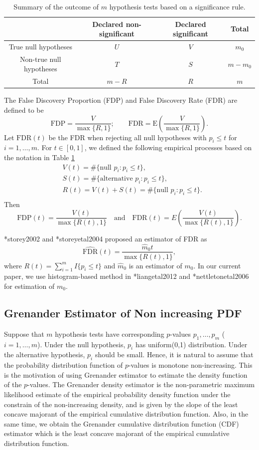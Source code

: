 \documentclass[12pt, letter]{article}\usepackage[]{graphicx}\usepackage[]{color}
\begin{document}
\begin{table}
\centering
\begin{tabular}{|c|cc|c|}
\hline
& Declared non-significant   & Declared significant & Total \\
\hline
True null hypotheses & $U$ & $V$ & $m_0$\\
Non-true null hypotheses & $T$ & $S$ & $m - m_0$\\
\hline
Total & $m-R$ & $R$ & $m$\\
\hline
\end{tabular}
\caption{Summary of the outcome of $m$ hypothesis tests based on a significance rule.}
\label{tab:t1}
\end{table}
The False Discovery Proportion (FDP) and False Discovery Rate (FDR) are defined to be
\[
\mbox{FDP} =\frac{V}{\max\{R,1\}};\qquad   \mbox{FDR} =\mbox{E}\left(\frac{V}{\max\{R,1\}} \right).
\]
Let $\mbox{FDR}(t)$ be the FDR when rejecting all null hypotheses with $p_i \leq t$ for $i = 1, \dots, m$. For $t\in [0,1]$, we  defined the following empirical processes based on the notation in Table \ref{tab:t1}
\begin{align*}
& V(t) = \#\{\mbox{null } p_i : p_i \leq t\},\\
& S(t) = \#\{\mbox{alternative } p_i : p_i \leq t\},\\
& R(t) = V(t) + S(t) =  \#\{\mbox{null } p_i : p_i \leq t\}.\\
\end{align*}
Then 
\[
\mbox{FDP}(t) = \frac{V(t)}{\max\{R(t), 1\}} \quad \mbox{and} \quad \mbox{FDR}(t) = E\left(\frac{V(t)}{\max\{R(t), 1\}}\right).
\]

\citeasnoun**{storey2002} and \citeasnoun**{storeyetal2004} proposed an estimator of FDR as 
\[
\widehat{\mbox{FDR}}(t) = \frac{\hat{m}_0 t}{\max\{R(t), 1\}},
\]
where $R(t) = \sum_{i = 1}^m I\{p_i \leq t\}$  and $\hat{m}_0$ is an estimator of $m_0$. In our current paper, we use histogram-based method in \citeasnoun**{liangetal2012} and \citeasnoun**{nettletonetal2006} for estimation of $m_0$. 

\subsection{Grenander Estimator of Non increasing PDF}
Suppose that $m$ hypothesis tests have corresponding $p$-values $p_1, \dots, p_m$ ($i = 1, \dots, m$). Under the null hypothesis, $p_i$ has uniform(0,1) distribution. Under the alternative hypothesis, $p_i$ should be small. Hence, it is natural to assume that the probability distribution function of $p$-values is monotone non-increasing. This is the motivation of using Grenander estimator to estimate the density function of the $p$-values.  The Grenander density estimator \cite{grenander1956} is the non-parametric maximum likelihood estimate of the empirical probability density function under the constrain of the non-increasing density, and  is given by the slope of the least concave majorant  of the empirical cumulative distribution function. Also, in the same time, we obtain the Grenander cumulative distribution function (CDF) estimator which is the least concave majorant of the empirical cumulative distribution function.   
\end{document}

